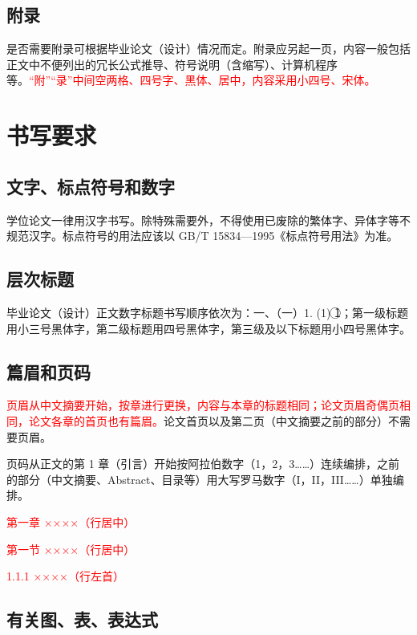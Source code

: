 \section{附录}

是否需要附录可根据毕业论文（设计）情况而定。附录应另起一页，内容一般包括正文中不便列出的冗长公式推导、符号说明（含缩写）、计算机程序等。\textcolor{red}{“附”“录”中间空两格、四号字、黑体、居中，内容采用小四号、宋体。}

\chapter{书写要求} \label{chpt:writing}

\section{文字、标点符号和数字}

学位论文一律用汉字书写。除特殊需要外，不得使用已废除的繁体字、异体字等不规范汉字。标点符号的用法应该以 GB/T 15834—1995《标点符号用法》为准。

\section{层次标题}

毕业论文（设计）正文数字标题书写顺序依次为：一、（一）1. (1) \textcircled{1}；第一级标题用小三号黑体字，第二级标题用四号黑体字，第三级及以下标题用小四号黑体字。

\section{篇眉和页码}

\textcolor{red}{页眉从中文摘要开始，按章进行更换，内容与本章的标题相同；论文页眉奇偶页相同，论文各章的首页也有篇眉。}论文首页以及第二页（中文摘要之前的部分）不需要页眉。

页码从正文的第 1 章（引言）开始按阿拉伯数字（1，2，3……）连续编排，之前的部分（中文摘要、Abstract、目录等）用大写罗马数字（I，II，III……）单独编排。

\textcolor{red}{第一章  ××××（行居中）}

\textcolor{red}{第一节  ××××（行居中）}

\textcolor{red}{1.1.1  ××××（行左首）}

\section{有关图、表、表达式}

